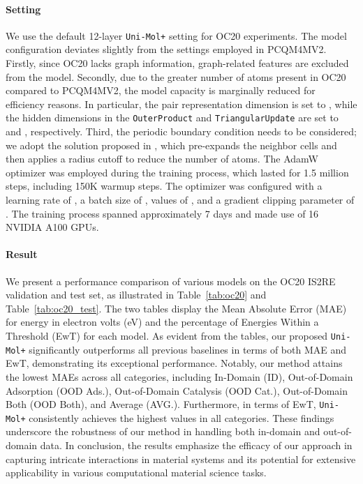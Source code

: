 \documentclass{article}
\newcommand{\name}{\texttt{Uni-Mol+}\xspace}
\newcommand{\opm}{\texttt{OuterProduct}\xspace}
\newcommand{\tm}{\texttt{TriangularUpdate}\xspace}
\begin{document}
\vspace{-6pt}
\paragraph{Setting}

We use the default 12-layer \name setting for OC20 experiments. The model configuration deviates slightly from the settings employed in PCQM4MV2. Firstly, since OC20 lacks graph information, graph-related features are excluded from the model. Secondly, due to the greater number of atoms present in OC20 compared to PCQM4MV2, the model capacity is marginally reduced for efficiency reasons. In particular, the pair representation dimension  is set to , while the hidden dimensions in the \opm and \tm are set to  and , respectively. 
Third, the periodic boundary condition needs to be considered; we adopt the solution proposed in \cite{shi2022benchmarking}, which pre-expands the neighbor cells and then applies a radius cutoff to reduce the number of atoms.
The AdamW optimizer was employed during the training process, which lasted for 1.5 million steps, including 150K warmup steps. The optimizer was configured with a learning rate of , a batch size of ,  values of , and a gradient clipping parameter of . 
The training process spanned approximately 7 days and made use of 16 NVIDIA A100 GPUs.

\vspace{-6pt}
\paragraph{Result} 

We present a performance comparison of various models on the OC20 IS2RE validation and test set, as illustrated in Table~\ref{tab:oc20} and Table~\ref{tab:oc20_test}. The two tables display the Mean Absolute Error (MAE) for energy in electron volts (eV) and the percentage of Energies Within a Threshold (EwT) for each model. As evident from the tables, our proposed \name significantly outperforms all previous baselines in terms of both MAE and EwT, demonstrating its exceptional performance. Notably, our method attains the lowest MAEs across all categories, including In-Domain (ID), Out-of-Domain Adsorption (OOD Ads.), Out-of-Domain Catalysis (OOD Cat.), Out-of-Domain Both (OOD Both), and Average (AVG.). Furthermore, in terms of EwT, \name consistently achieves the highest values in all categories. These findings underscore the robustness of our method in handling both in-domain and out-of-domain data.
In conclusion, the results emphasize the efficacy of our approach in capturing intricate interactions in material systems and its potential for extensive applicability in various computational material science tasks.
\end{document}

